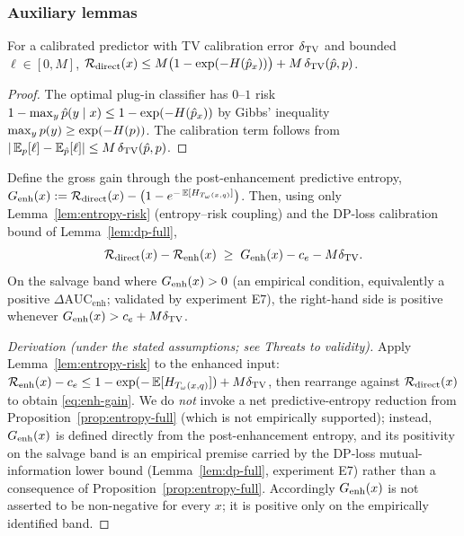 \subsubsection{Auxiliary lemmas}\label{app:a2-thm2-lemmas}
\begin{lemma}\label{lem:entropy-risk}
For a calibrated predictor with TV calibration error $\delta_{\mathrm{TV}}$ and bounded
$\ell\in[0,M]$,
$\mathcal{R}_{\mathrm{direct}}(x) \leq M\big(1-\exp(-H(\hat{p}_x))\big) + M\,\delta_{\mathrm{TV}}(\hat{p},p)$.
\end{lemma}
\begin{proof}
The optimal plug-in classifier has $0$--$1$ risk $1-\max_y\hat{p}(y\mid x)\leq 1-\exp(-H(\hat{p}_x))$
by Gibbs' inequality $\max_y p(y)\geq\exp(-H(p))$. The calibration term follows from
$|\operatorname*{\mathbb{E}}_p[\ell]-\operatorname*{\mathbb{E}}_{\hat{p}}[\ell]|\leq M\,\delta_{\mathrm{TV}}(\hat{p},p)$.
\end{proof}

\begin{lemma}\label{lem:enh-risk}
Define the gross gain through the post-enhancement predictive entropy,
$G_{\mathrm{enh}}(x):=\mathcal{R}_{\mathrm{direct}}(x)-\big(1-e^{-\operatorname*{\mathbb{E}}[H_{T_\omega(x,q)}]}\big)$. Then, using only
Lemma~\ref{lem:entropy-risk} (entropy--risk coupling) and the DP-loss calibration bound of
Lemma~\ref{lem:dp-full},
\begin{equation}
\mathcal{R}_{\mathrm{direct}}(x) - \mathcal{R}_{\mathrm{enh}}(x) \;\geq\; G_{\mathrm{enh}}(x) - c_e - M\delta_{\mathrm{TV}}.
\label{eq:enh-gain}
\end{equation}
On the salvage band where $G_{\mathrm{enh}}(x)>0$ (an empirical condition, equivalently a positive
$\Delta\mathrm{AUC}_{\mathrm{enh}}$; validated by experiment E7), the right-hand side is
positive whenever $G_{\mathrm{enh}}(x)>c_e+M\delta_{\mathrm{TV}}$.
\end{lemma}
\begin{proof}[Derivation (under the stated assumptions; see Threats to validity)]
Apply Lemma~\ref{lem:entropy-risk} to the enhanced input:
$\mathcal{R}_{\mathrm{enh}}(x)-c_e \leq 1-\exp(-\operatorname*{\mathbb{E}}[H_{T_\omega(x,q)}]) + M\delta_{\mathrm{TV}}$, then rearrange against
$\mathcal{R}_{\mathrm{direct}}(x)$ to obtain \eqref{eq:enh-gain}. We do \emph{not} invoke a net predictive-entropy
reduction from Proposition~\ref{prop:entropy-full} (which is not empirically supported);
instead, $G_{\mathrm{enh}}(x)$ is defined directly from the post-enhancement entropy, and its positivity
on the salvage band is an empirical premise carried by the DP-loss mutual-information lower
bound (Lemma~\ref{lem:dp-full}, experiment E7) rather than a consequence of
Proposition~\ref{prop:entropy-full}. Accordingly $G_{\mathrm{enh}}(x)$ is not asserted to be non-negative
for every $x$; it is positive only on the empirically identified band.
\end{proof}

